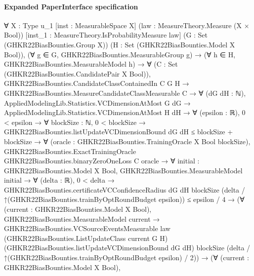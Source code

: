 \documentclass[10pt]{article}
\begin{document}
\paragraph{Expanded PaperInterface specification}
\begin{ReviewVerbatim}
∀ {X : Type u_1} [inst : MeasurableSpace X] (law : MeasureTheory.Measure (X × Bool))
  [inst_1 : MeasureTheory.IsProbabilityMeasure law] (G : Set (GHKR22BiasBounties.Group X))
  (H : Set (GHKR22BiasBounties.Model X Bool)),
  (∀ g ∈ G, GHKR22BiasBounties.MeasurableGroup g) →
    (∀ h ∈ H, GHKR22BiasBounties.MeasurableModel h) →
      ∀ (C : Set (GHKR22BiasBounties.CandidatePair X Bool)),
        GHKR22BiasBounties.CandidateClassContainedIn C G H →
          GHKR22BiasBounties.MeasureCandidateClassMeasurable C →
            ∀ (dG dH : ℕ),
              AppliedModelingLib.Statistics.VCDimensionAtMost G dG →
                AppliedModelingLib.Statistics.VCDimensionAtMost H dH →
                  ∀ (epsilon : ℝ),
                    0 < epsilon →
                      ∀ {blockSize : ℕ},
                        0 < blockSize →
                          GHKR22BiasBounties.listUpdateVCDimensionBound dG dH ≤ blockSize + blockSize →
                            ∀ (oracle : GHKR22BiasBounties.TrainingOracle X Bool blockSize),
                              GHKR22BiasBounties.ExactTrainingOracle GHKR22BiasBounties.binaryZeroOneLoss C oracle →
                                ∀ {initial : GHKR22BiasBounties.Model X Bool},
                                  GHKR22BiasBounties.MeasurableModel initial →
                                    ∀ (delta : ℝ),
                                      0 < delta →
                                        GHKR22BiasBounties.certificateVCConfidenceRadius dG dH blockSize
                                              (delta / ↑(GHKR22BiasBounties.trainByOptRoundBudget epsilon)) ≤
                                            epsilon / 4 →
                                          (∀ (current : GHKR22BiasBounties.Model X Bool),
                                              GHKR22BiasBounties.MeasurableModel current →
                                                GHKR22BiasBounties.VCSourceEventsMeasurable law
                                                  (GHKR22BiasBounties.ListUpdateClass current G H)
                                                  (GHKR22BiasBounties.listUpdateVCDimensionBound dG dH) blockSize
                                                  (delta / ↑(GHKR22BiasBounties.trainByOptRoundBudget epsilon) / 2)) →
                                            (∀ (current : GHKR22BiasBounties.Model X Bool),

\end{ReviewVerbatim}
\end{document}
